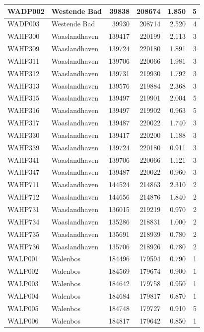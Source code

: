 \documentclass[11pt,]{book}
\begin{document}
\begin{table}
\begin{tabular}[t]{l|l|r|r|r|r}
\hline
WADP002 & Westende Bad & 39838 & 208674 & 1.850 & 5\\
\hline
WADP003 & Westende Bad & 39930 & 208714 & 2.520 & 4\\
\hline
WAHP300 & Waaslandhaven & 139417 & 220199 & 2.113 & 3\\
\hline
WAHP309 & Waaslandhaven & 139724 & 220180 & 1.891 & 3\\
\hline
WAHP311 & Waaslandhaven & 139706 & 220066 & 1.981 & 3\\
\hline
WAHP312 & Waaslandhaven & 139731 & 219930 & 1.792 & 3\\
\hline
WAHP313 & Waaslandhaven & 139576 & 219884 & 2.368 & 3\\
\hline
WAHP315 & Waaslandhaven & 139497 & 219901 & 2.004 & 5\\
\hline
WAHP316 & Waaslandhaven & 139497 & 219902 & 0.963 & 5\\
\hline
WAHP317 & Waaslandhaven & 139487 & 220022 & 1.740 & 3\\
\hline
WAHP330 & Waaslandhaven & 139417 & 220200 & 1.188 & 3\\
\hline
WAHP339 & Waaslandhaven & 139724 & 220180 & 0.911 & 3\\
\hline
WAHP341 & Waaslandhaven & 139706 & 220066 & 1.121 & 3\\
\hline
WAHP347 & Waaslandhaven & 139487 & 220022 & 0.960 & 3\\
\hline
WAHP711 & Waaslandhaven & 144524 & 214863 & 2.310 & 2\\
\hline
WAHP712 & Waaslandhaven & 144656 & 214876 & 1.840 & 2\\
\hline
WAHP731 & Waaslandhaven & 136015 & 219219 & 0.970 & 2\\
\hline
WAHP734 & Waaslandhaven & 135286 & 218831 & 1.000 & 2\\
\hline
WAHP735 & Waaslandhaven & 135691 & 218939 & 0.780 & 2\\
\hline
WAHP736 & Waaslandhaven & 135706 & 218926 & 0.780 & 2\\
\hline
WALP001 & Walenbos & 184496 & 179594 & 0.790 & 1\\
\hline
WALP002 & Walenbos & 184569 & 179674 & 0.900 & 1\\
\hline
WALP003 & Walenbos & 184642 & 179758 & 0.950 & 1\\
\hline
WALP004 & Walenbos & 184684 & 179817 & 0.870 & 1\\
\hline
WALP005 & Walenbos & 184748 & 179727 & 0.910 & 5\\
\hline
WALP006 & Walenbos & 184817 & 179642 & 0.850 & 1\\

\end{tabular}
\end{table}
\end{document}
